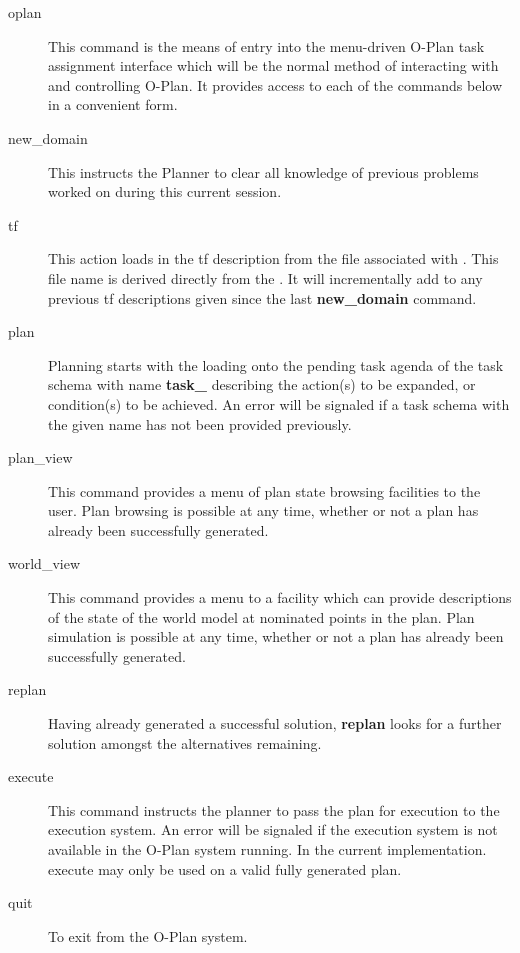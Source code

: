 \begin{description}

\item[oplan]
This command is the means of entry into the menu-driven O-Plan task
assignment interface which will be the normal method of interacting with and
controlling O-Plan.  It provides access to each of the commands below in a
convenient form.

\item[new\_domain]
This instructs the Planner to clear all knowledge of previous problems worked
on during this current session.

\item[tf ]
This action loads in the {\sc tf} description from
the file associated with . This file name is derived
directly from the .  It will incrementally add
to any previous {\sc tf} descriptions given since the last
{\bf new\_domain} command.

\item[plan ]
Planning starts with the loading onto the pending task agenda of the task
schema with name {\bf task\_} describing the action(s)
to be expanded, or condition(s) to be achieved.  An error will be signaled if
a task schema with the given name has not been provided previously.

\item[plan\_view]
This command provides a menu of plan state browsing facilities to the user.
Plan browsing is possible at any time, whether or not a plan has already been
successfully generated.

\item[world\_view]
This command provides a menu to a facility which can provide descriptions of
the state of the world model at nominated points in the plan.  Plan simulation
is possible at any time, whether or not a plan has already been successfully
generated.

\item[replan]
Having already generated a successful solution, {\bf replan} looks for a
further solution amongst the alternatives remaining.

\item[execute]
This command instructs the planner to pass the plan for execution to the
execution system.  An error will be signaled if the execution system is not
available in the O-Plan system running.  In the current implementation.
execute may only be used on a valid fully generated plan.

\item[quit]
To exit from the O-Plan system.
\end{description}

